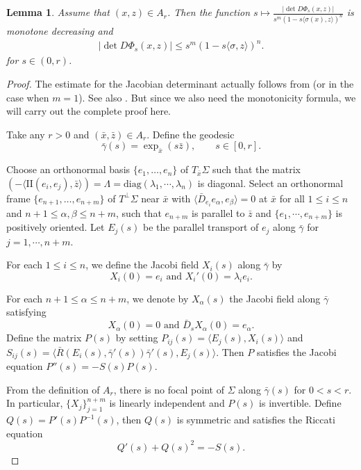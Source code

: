 \documentclass[11pt, reqno]{amsart}
\newtheorem{lemma}[theorem]{Lemma}
\numberwithin{equation}{section}
\begin{document}
\begin{lemma}\label{lem 2.4''}
Assume that $(x, z) \in A_r$. Then the function
$s \mapsto \frac{|\det D\Phi_s(x, z)|}{s^m(1-s\langle \sigma(x), z\rangle)^n}$
is monotone decreasing and
\begin{align*}
|\det D\Phi_s(x, z)|\le {s^m(1-s\langle \sigma, z\rangle)^n}.
\end{align*}
for $s \in(0, r)$.
\end{lemma}

\begin{proof}
The estimate for the Jacobian determinant actually follows from \cite[Corollary 3.3.1]{HeintzeKarcher1978} (or \cite[Corollary 3.3.2]{HeintzeKarcher1978} in the case when $m=1$). See also \cite{Chahine2019}. But since we also need the monotonicity formula, we will carry out the complete proof here.

Take any $r>0$ and $(\bar{x}, \bar{z})\in A_r$.
Define the geodesic
$$
\bar{\gamma}(s)=\exp_{\bar{x}}(s\bar{z}), \qquad s\in[0, r].
$$

Choose an orthonormal basis $\{e_1, \dots, e_n\}$ of $T_{\bar{x}}\Sigma$ such that the matrix $\left(-\langle \mathrm{II}(e_i, e_j), \bar{z}\rangle\right)=\Lambda=\mathrm{diag}(\lambda_1, \cdots, \lambda_n)$ is diagonal.
Select an orthonormal frame $\{e_{n+1}, \dots, e_{n+m}\}$ of $T^\perp\Sigma$ near $\bar{x}$ with $\langle\bar D_{e_i}e_\alpha, e_\beta\rangle=0$ at $\bar{x}$ for all $1\le i\le n$ and $n+1\le\alpha, \beta\le n+m$, such that $e_{n+m}$ is parallel to $\bar z$ and $\{e_1, \cdots, e_{n+m}\}$ is positively oriented.
Let $E_j(s)$ be the parallel transport of $e_j$ along $\bar{\gamma}$ for $j=1, \cdots, n+m$.

For each $1\le i\le n$, we define the Jacobi field $X_i(s)$ along $\bar{\gamma}$ by
$$ X_i(0)=e_i \text{ and }X_i'(0)
=\lambda_i e_i.
$$

For each $n+1 \le \alpha \le n+m$, we denote by $X_\alpha(s)$ the Jacobi field along $\bar{\gamma}$ satisfying
\begin{equation*}
X_\alpha(0)=0\text{ and }\bar{D}_s X_\alpha(0)=e_\alpha.
\end{equation*}
Define the matrix $P(s)$ by setting $P_{ij}(s)=\langle E_j(s), X_i(s)\rangle$ and $S_{ij}(s)=\langle \bar{R} (E_i(s), \bar{\gamma}'(s)) \bar{\gamma}'(s), E_j(s)\rangle$. Then $P$ satisfies the Jacobi equation $P''(s)=-S(s)P(s)$.

From the definition of $A_r$, there is no focal point of $\Sigma$ along $\bar\gamma(s)$ for $0<s<r$. In particular, $\{X_j\}_{j=1}^{n+m}$ is linearly independent and $P(s)$ is invertible. Define $Q(s)=P'(s)P^{-1}(s)$, then $Q(s)$ is symmetric and satisfies the Riccati equation
$$
Q'(s)+Q(s)^2=-S(s).
$$


\end{proof}
\end{document}
